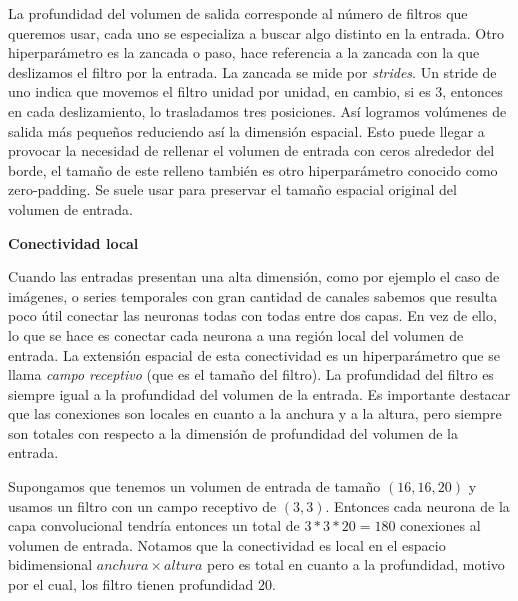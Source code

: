         La profundidad del volumen de salida corresponde al número de filtros que queremos usar, cada uno se especializa a buscar algo distinto en la entrada. Otro hiperparámetro es la zancada o paso, hace referencia a la zancada con la que deslizamos el filtro por la entrada. La zancada se mide por \textit{strides}. Un stride de uno indica que movemos el filtro unidad por unidad, en cambio, si es 3, entonces en cada deslizamiento, lo trasladamos tres posiciones. Así logramos volúmenes de salida más pequeños reduciendo así la dimensión espacial. Esto puede llegar a provocar la necesidad de rellenar el volumen de entrada con ceros alrededor del borde, el tamaño de este relleno también es otro hiperparámetro conocido como zero-padding. Se suele usar para preservar el tamaño espacial original del volumen de entrada. \\
        
        
        \begin{center}
            \textbf{Conectividad local}
        \end{center}
    
        Cuando las entradas presentan una alta dimensión, como por ejemplo el caso de imágenes, o series temporales con gran cantidad de canales sabemos que resulta poco útil conectar las neuronas todas con todas entre dos capas. En vez de ello, lo que se hace es conectar cada neurona a una región local del volumen de entrada. La extensión espacial de esta conectividad es un hiperparámetro que se llama \textit{campo receptivo} (que es el tamaño del filtro). La profundidad del filtro es siempre igual a la profundidad del volumen de la entrada. Es importante destacar que las conexiones son locales en cuanto a la anchura y a la altura, pero siempre son totales con respecto a la dimensión de profundidad del volumen de la entrada.
        
        \begin{ejemplo}
        Supongamos que tenemos un volumen de entrada de tamaño $(16,16,20)$ y usamos un filtro con un campo receptivo de $(3,3)$. Entonces cada neurona de la capa convolucional tendría entonces un total de $3*3*20 = 180$ conexiones al volumen de entrada. Notamos que la conectividad es local en el espacio bidimensional $anchura \times altura$ pero es total en cuanto a la profundidad, motivo por el cual, los filtro tienen profundidad $20$.
        \end{ejemplo}
        
